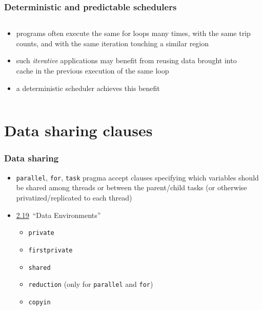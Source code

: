 \documentclass[12pt,dvipdfmx]{beamer}
\newcommand{\sectionompdataenv}{{\href{https://www.openmp.org/spec-html/5.0/openmpse27.html\#x135-5430002.19}{2.19}}}
\newcommand{\ao}[1]{{\color{blue}#1}}
\begin{document}
\begin{frame}[fragile]
\frametitle{Deterministic and predictable schedulers}
\begin{columns}
\begin{column}{0.7\textwidth}
\begin{itemize}
\item programs often execute the same for loops many times,
  with the same trip counts, and with the same iteration
  touching a similar region 
\item such \ao{\em iterative} applications may benefit from
  reusing data brought into cache in the previous execution
  of the same loop
\item a deterministic scheduler achieves this benefit
\end{itemize}
\end{column}

\begin{column}{0.3\textwidth}
\def\svgwidth{0.6\textwidth}
{\scriptsize }
\end{column}
\end{columns}

\end{frame}


\section{Data sharing clauses}

\begin{frame}
\frametitle{Data sharing}
\begin{itemize}
\item {\tt parallel}, {\tt for}, {\tt task} pragma accept
  clauses specifying which variables should be shared among threads
  or between the parent/child tasks
  (or otherwise privatized/replicated to each thread)
\item \sectionompdataenv\ ``Data Environments''
  \begin{itemize}
  \item \ao{\tt private}
  \item {\tt firstprivate}
  \item \ao{\tt shared}
  \item \ao{\tt reduction} (only for {\tt parallel} and {\tt for})
  \item {\tt copyin}
  \end{itemize}
\end{itemize}
\end{frame}
\end{document}
